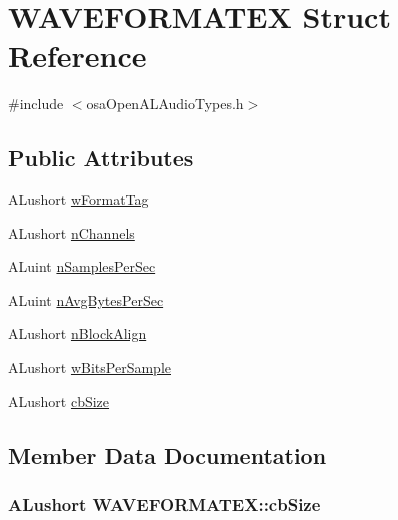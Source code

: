 \hypertarget{struct_w_a_v_e_f_o_r_m_a_t_e_x}{}\section{W\+A\+V\+E\+F\+O\+R\+M\+A\+T\+E\+X Struct Reference}
\label{struct_w_a_v_e_f_o_r_m_a_t_e_x}


{\ttfamily \#include $<$osa\+Open\+A\+L\+Audio\+Types.\+h$>$}

\subsection*{Public Attributes}
\begin{DoxyCompactItemize}
\item 
A\+Lushort \hyperlink{struct_w_a_v_e_f_o_r_m_a_t_e_x_ae64cc7e3612e90153b9c85278e819661}{w\+Format\+Tag}
\item 
A\+Lushort \hyperlink{struct_w_a_v_e_f_o_r_m_a_t_e_x_a723622211fcfa3371a72f4b2955c0adf}{n\+Channels}
\item 
A\+Luint \hyperlink{struct_w_a_v_e_f_o_r_m_a_t_e_x_a32952b7d978d3cb6032ddbcddde933ce}{n\+Samples\+Per\+Sec}
\item 
A\+Luint \hyperlink{struct_w_a_v_e_f_o_r_m_a_t_e_x_a9c4552a741e95a77db5ca70559aa460b}{n\+Avg\+Bytes\+Per\+Sec}
\item 
A\+Lushort \hyperlink{struct_w_a_v_e_f_o_r_m_a_t_e_x_a3b2bf371bd87c8e3ed7d7ed451b19b2c}{n\+Block\+Align}
\item 
A\+Lushort \hyperlink{struct_w_a_v_e_f_o_r_m_a_t_e_x_a7131210349a03e87c94d2f08a1530002}{w\+Bits\+Per\+Sample}
\item 
A\+Lushort \hyperlink{struct_w_a_v_e_f_o_r_m_a_t_e_x_afe171567c7025baab483b46cb1ec54bb}{cb\+Size}
\end{DoxyCompactItemize}


\subsection{Member Data Documentation}
\hypertarget{struct_w_a_v_e_f_o_r_m_a_t_e_x_afe171567c7025baab483b46cb1ec54bb}{}
\subsubsection[{cb\+Size}]{\setlength{\rightskip}{0pt plus 5cm}A\+Lushort W\+A\+V\+E\+F\+O\+R\+M\+A\+T\+E\+X\+::cb\+Size}\label{struct_w_a_v_e_f_o_r_m_a_t_e_x_afe171567c7025baab483b46cb1ec54bb}
\hypertarget{struct_w_a_v_e_f_o_r_m_a_t_e_x_a9c4552a741e95a77db5ca70559aa460b}{}
